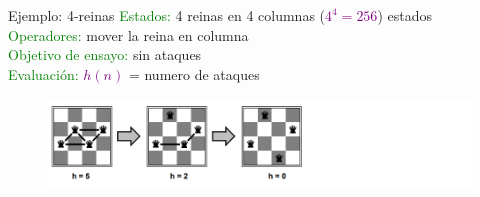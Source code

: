     \begin{frame}{Ejemplo: 4-reinas}
        \textcolor{Green}{Estados:} 4 reinas en 4 columnas (\textcolor{Purple}{$4^4=256$}) estados\\
        \textcolor{Green}{Operadores:} mover la reina en columna\\
        \textcolor{Green}{Objetivo de ensayo:} sin ataques\\
        \textcolor{Green}{Evaluación:} \textcolor{Purple}{$h(n)$} = numero de ataques
        \begin{figure}\includegraphics[width =120mm]{38img.png}\end{figure}
        
    \end{frame}
